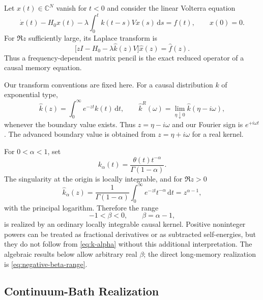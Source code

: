 \documentclass[11pt,reqno]{amsart}
\theoremstyle{remark}
\newcommand{\C}{\mathbb C}
\newcommand{\dd}{\,\mathrm d}
\begin{document}
Let $x(t)\in\C^N$ vanish for $t<0$ and consider the linear Volterra equation
\begin{equation}\label{eq:volterra}
 \dot x(t)-H_0x(t)
 -\lambda\int_0^t k(t-s)Vx(s)\dd s=f(t),
 \qquad x(0)=0.
\end{equation}
For $\Re z$ sufficiently large, its Laplace transform is
\begin{equation}\label{eq:volterra-laplace}
 \bigl[zI-H_0-\lambda\widehat k(z)V\bigr]\widehat x(z)
 =\widehat f(z).
\end{equation}
Thus a frequency-dependent matrix pencil is the exact reduced operator of a
causal memory equation.

Our transform conventions are fixed here.  For a causal distribution $k$ of
exponential type,
\begin{equation}\label{eq:transform-conventions}
 \widehat k(z)=\int_0^\infty e^{-zt}k(t)\dd t,
 \qquad
 \widehat k^R(\omega)
 =\lim_{\eta\downarrow0}\widehat k(\eta-i\omega),
\end{equation}
whenever the boundary value exists.  Thus $z=\eta-i\omega$ and our Fourier
sign is $e^{+i\omega t}$.  The advanced boundary value is obtained from
$z=\eta+i\omega$ for a real kernel.

For $0<\alpha<1$, set
\begin{equation}\label{eq:k-alpha}
 k_\alpha(t)=\frac{\theta(t)t^{-\alpha}}{\Gamma(1-\alpha)}.
\end{equation}
The singularity at the origin is locally integrable, and for $\Re z>0$
\begin{equation}\label{eq:laplace-power}
 \widehat k_\alpha(z)
 =\frac1{\Gamma(1-\alpha)}
   \int_0^\infty e^{-zt}t^{-\alpha}\dd t
 =z^{\alpha-1},
\end{equation}
with the principal logarithm.  Therefore the range
\begin{equation}\label{eq:negative-beta-range}
 -1<\beta<0,\qquad \beta=\alpha-1,
\end{equation}
is realized by an ordinary locally integrable causal kernel.  Positive
noninteger powers can be treated as fractional derivatives or as subtracted
self-energies, but they do not follow from \eqref{eq:k-alpha} without this
additional interpretation.  The algebraic results below allow arbitrary
real $\beta$; the direct long-memory realization is \eqref{eq:negative-beta-range}.

\subsection{Continuum-Bath Realization}
\end{document}
